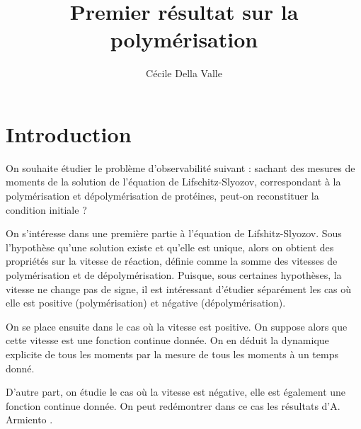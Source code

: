 \documentclass[a4paper]{article}
\title{Premier résultat sur la polymérisation}
\author{Cécile Della Valle}
\begin{document}
\maketitle

\section{Introduction}

On souhaite étudier le problème d'observabilité suivant : sachant des mesures de moments de la solution de l'équation de Lifschitz-Slyozov, correspondant à la polymérisation et dépolymérisation de protéines, peut-on reconstituer la condition initiale ?

On s'intéresse dans une première partie à l'équation de Lifshitz-Slyozov. 
Sous l'hypothèse qu'une solution existe et qu'elle est unique, alors on obtient des propriétés sur la vitesse de réaction, définie comme la somme des vitesses de polymérisation et de dépolymérisation.
Puisque, sous certaines hypothèses, la vitesse ne change pas de signe, il est intéressant d'étudier séparément les cas où elle est positive (polymérisation) et négative (dépolymérisation).


On se place ensuite dans le cas où la vitesse est positive. On suppose alors que cette vitesse est une fonction continue donnée. 
On en déduit la dynamique explicite de tous les moments par la mesure de tous les moments à un temps donné.

D'autre part, on étudie le cas où la vitesse est négative, elle est également une fonction continue donnée. On peut redémontrer dans ce cas les résultats d'A. Armiento \cite{AArmiento}.

 


\end{document}
